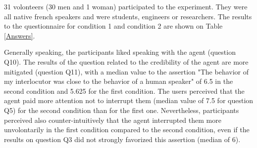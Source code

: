 31 volonteers (30 men and 1 woman) participated to the experiment. They were all native french speakers and were students, engineers or researchers. The results to the questionnaire for condition 1 and condition 2 are shown on Table \ref{Answers}. 
\begin{table}
\centering
{}
\caption{Mean agreements of the participants for conditions 1 and condition 2 (translated from French).}
\label{Answers}
\end{table}

Generally speaking, the participants liked speaking with the agent (question Q10). The results of the question related to the credibility of the agent are more mitigated (question Q11), with a median value to the assertion "The behavior of my interlocutor was close to the behavior of a human speaker" of 6.5 in the second condition and 5.625 for the first condition. The users perceived that the agent paid more attention not to interrupt them (median value of 7.5 for question Q5) for the second condition than for the first one. Nevertheless, participants perceived also counter-intuitively that the agent interrupted them more unvolontarily in the first condition compared to the second condition, even if the results on question Q3 did not strongly favorized this assertion (median of 6). 

